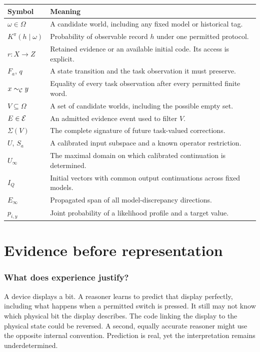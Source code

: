 \documentclass[11pt,letterpaper]{article}
\theoremstyle{plain}
\theoremstyle{definition}
\begin{document}
\begin{center}\small
\begin{tabularx}{\textwidth}{@{}lX@{}}\toprule
Symbol & Meaning\\\midrule
$\omega\in\Omega$ & A candidate world, including any fixed model or historical tag.\\
$K^\pi(h\mid\omega)$ & Probability of observable record $h$ under one permitted protocol.\\
$r:X\to Z$ & Retained evidence or an available initial code. Its access is explicit.\\
$F_a$, $q$ & A state transition and the task observation it must preserve.\\
$x\sim_{\mathcal C}y$ & Equality of every task observation after every permitted finite word.\\
$V\subseteq\Omega$ & A set of candidate worlds, including the possible empty set.\\
$E\in\mathcal E$ & An admitted evidence event used to filter $V$.\\
$\Sigma(V)$ & The complete signature of future task-valued corrections.\\
$U$, $S_a$ & A calibrated input subspace and a known operator restriction.\\
$U_\infty$ & The maximal domain on which calibrated continuation is determined.\\
$I_Q$ & Initial vectors with common output continuations across fixed models.\\
$E_\infty$ & Propagated span of all model-discrepancy directions.\\
$p_{i,y}$ & Joint probability of a likelihood profile and a target value.\\\bottomrule
\end{tabularx}\end{center}
\clearpage{}
\part{Evidence before representation}
\section{What does experience justify?}\label{sec:introduction}
A device displays a bit. A reasoner learns to predict that display perfectly, including what happens when a permitted switch is pressed. It still may not know which physical bit the display describes. The code linking the display to the physical state could be reversed. A second, equally accurate reasoner might use the opposite internal convention. Prediction is real, yet the interpretation remains underdetermined.
\end{document}
